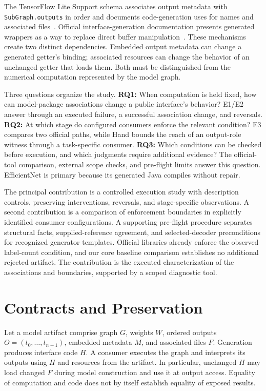 \documentclass[10pt,twocolumn,letterpaper]{article}
\newcommand{\code}[1]{\texttt{#1}}
\begin{document}
The TensorFlow Lite Support schema associates output metadata with \code{SubGraph.outputs} in order and documents code-generation uses for names and associated files~\cite{schema}. Official interface-generation documentation presents generated wrappers as a way to replace direct buffer manipulation~\cite{codegen-doc}. These mechanisms create two distinct dependencies. Embedded output metadata can change a generated getter's binding; associated resources can change the behavior of an unchanged getter that loads them. Both must be distinguished from the numerical computation represented by the model graph.

Three questions organize the study. \textbf{RQ1:} When computation is held fixed, how can model-package associations change a public interface's behavior? E1/E2 answer through an executed failure, a successful association change, and reversals. \textbf{RQ2:} At which stage do configured consumers enforce the relevant condition? E3 compares two official paths, while Hand bounds the reach of an output-role witness through a task-specific consumer. \textbf{RQ3:} Which conditions can be checked before execution, and which judgments require additional evidence? The official-tool comparison, external scope checks, and pre-flight limits answer this question. EfficientNet is primary because its generated Java compiles without repair.

The principal contribution is a controlled execution study with description controls, preserving interventions, reversals, and stage-specific observations. A second contribution is a comparison of enforcement boundaries in explicitly identified consumer configurations. A supporting pre-flight procedure separates structural facts, supplied-reference agreement, and selected-decoder preconditions for recognized generator templates. Official libraries already enforce the observed label-count condition, and our core baseline comparison establishes no additional rejected artifact. The contribution is the executed characterization of the associations and boundaries, supported by a scoped diagnostic tool.

\section{Contracts and Preservation}
\label{sec:contracts}
Let a model artifact comprise graph $G$, weights $W$, ordered outputs $O=(t_0,\ldots,t_{n-1})$, embedded metadata $M$, and associated files $F$. Generation produces interface code $H$. A consumer executes the graph and interprets its outputs using $H$ and resources from the artifact. In particular, unchanged $H$ may load changed $F$ during model construction and use it at output access. Equality of computation and code does not by itself establish equality of exposed results.
\end{document}
